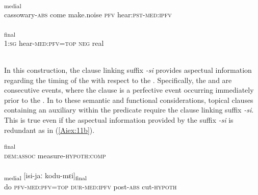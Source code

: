 \documentclass[output=paper]{LSP/langsci}
\begin{document}
\begin{exe}
\ex \label{Aiex:10ab}
\begin{xlist}
\ex \label{Aiex:10a}
\textsubscript{medial}\\
cassowary-\textsc{abs}	come	make.noise	\textsc{pfv}	hear:\textsc{pst}-\textsc{med}:\textsc{ipfv}\\
\glt {}\\
\ex \label{Aiex:10b}
\textsubscript{final}\\
1:\textsc{sg}	hear-\textsc{med}:\textsc{pfv}=\textsc{top}	\textsc{neg}	real\\
\glt {}\\
\end{xlist}
\end{exe}

In this construction, the clause linking suffix \textit{-si} provides aspectual information regarding the timing of the  with respect to the . Specifically, the  and  are consecutive events, where the  clause is a perfective event occurring immediately prior to the .
	In  to these semantic and functional considerations, topical clauses containing an auxiliary within the predicate require the clause linking suffix  \textit{-si}. This is true even if the aspectual information provided by the suffix  \textit{-si} is redundant as in (\ref{Aiex:11b}).

\begin{exe}
\ex \label{Aiex:11ab}
\begin{xlist}
\ex \label{Aiex:11a}
\textsubscript{final}\\
\textsc{dem}:\textsc{assoc}	measure-\textsc{hypoth}:\textsc{comp}\\
\glt {}\\
\ex \label{Aiex:11b}
\textsubscript{medial}	[isi-jaː	kodu-mɛi]\textsubscript{final}\\
do	\textsc{pfv}-\textsc{med}:\textsc{pfv}=\textsc{top}	\textsc{dur}-\textsc{med}:\textsc{ipfv}	post-\textsc{abs}	cut-\textsc{hypoth}\\
\glt {}\\
\end{xlist}
\end{exe}
\end{document}
